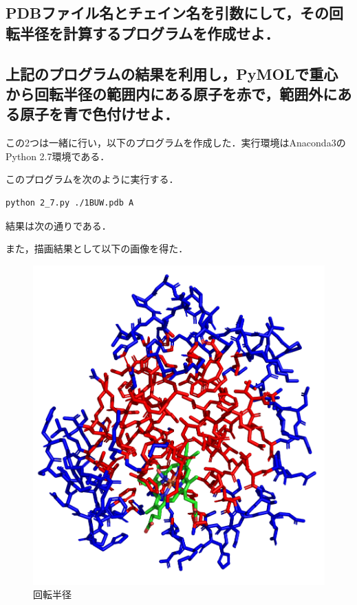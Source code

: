 \documentclass[uplatex,a4j]{jsarticle}
\begin{document}
  \subsection{PDBファイル名とチェイン名を引数にして，その回転半径を計算するプログラムを作成せよ．}
  \subsection{上記のプログラムの結果を利用し，PyMOLで重心から回転半径の範囲内にある原子を赤で，範囲外にある原子を青で色付けせよ．}
  この2つは一緒に行い，以下のプログラムを作成した．実行環境はAnaconda3のPython 2.7環境である．
  
  このプログラムを次のように実行する．
  \begin{lstlisting}[caption=実行方法, label=run6]
    python 2_7.py ./1BUW.pdb A
  \end{lstlisting}
  結果は次の通りである．
  
  また，描画結果として以下の画像を得た．
  \begin{figure}[H]
    \begin{center}
      \includegraphics[width=12cm]{2_8.png}
      \caption{回転半径}
      \label{2_8}
    \end{center}
  \end{figure}
  
\end{document}
